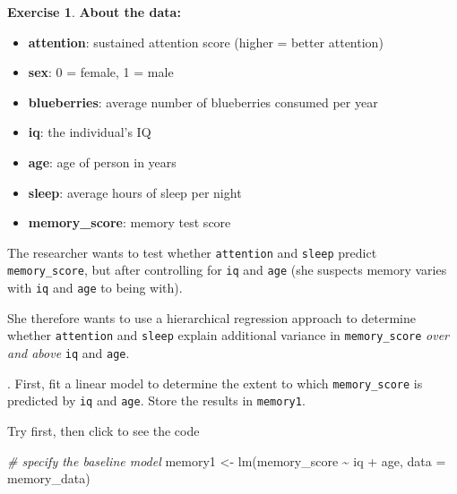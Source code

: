 \documentclass[
]{book}
\newenvironment{Shaded}{\begin{snugshade}}{\end{snugshade}}
\newcommand{\AttributeTok}[1]{\textcolor[rgb]{0.77,0.63,0.00}{#1}}
\newcommand{\CommentTok}[1]{\textcolor[rgb]{0.56,0.35,0.01}{\textit{#1}}}
\newcommand{\FunctionTok}[1]{\textcolor[rgb]{0.00,0.00,0.00}{#1}}
\newcommand{\NormalTok}[1]{#1}
\newcommand{\OtherTok}[1]{\textcolor[rgb]{0.56,0.35,0.01}{#1}}
\newcommand{\SpecialCharTok}[1]{\textcolor[rgb]{0.00,0.00,0.00}{#1}}
\theoremstyle{definition}
\theoremstyle{definition}
\theoremstyle{definition}
\newtheorem{exercise}{Exercise}[chapter]
\theoremstyle{definition}
\theoremstyle{remark}
\begin{document}
\begin{exercise}
\textbf{About the data:}

\begin{itemize}
\item
  \textbf{attention}: sustained attention score (higher = better attention)
\item
  \textbf{sex}: 0 = female, 1 = male
\item
  \textbf{blueberries}: average number of blueberries consumed per year
\item
  \textbf{iq}: the individual's IQ
\item
  \textbf{age}: age of person in years
\item
  \textbf{sleep}: average hours of sleep per night
\item
  \textbf{memory\_score}: memory test score
\end{itemize}

The researcher wants to test whether \texttt{attention} and \texttt{sleep} predict \texttt{memory\_score}, but after controlling for \texttt{iq} and \texttt{age} (she suspects memory varies with \texttt{iq} and \texttt{age} to being with).

\hfill\break
She therefore wants to use a hierarchical regression approach to determine whether \texttt{attention} and \texttt{sleep} explain additional variance in \texttt{memory\_score} \emph{over and above} \texttt{iq} and \texttt{age}.

\hfill{}. First, fit a linear model to determine the extent to which \texttt{memory\_score} is predicted by \texttt{iq} and \texttt{age}. Store the results in \texttt{memory1}.

Try first, then click to see the code

\begin{Shaded}
\begin{Highlighting}[]
\CommentTok{\# specify the baseline model}
\NormalTok{memory1 }\OtherTok{\textless{}{-}} \FunctionTok{lm}\NormalTok{(memory\_score }\SpecialCharTok{\textasciitilde{}}\NormalTok{ iq }\SpecialCharTok{+}\NormalTok{ age, }\AttributeTok{data =}\NormalTok{ memory\_data)}


\end{Highlighting}
\end{Shaded}
\end{exercise}
\end{document}
